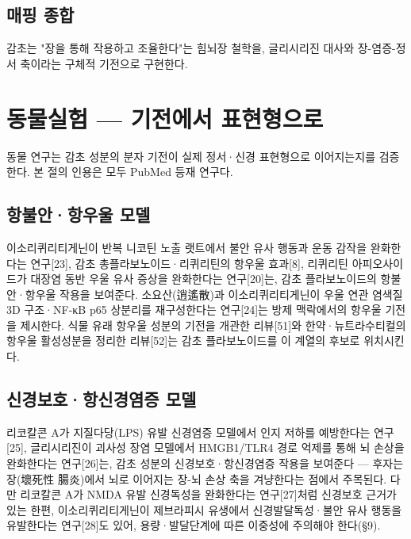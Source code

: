 \documentclass[11pt,oneside]{book}
\begin{document}
\subsection{매핑 종합}
\vspace{2pt}\vspace{3pt}

감초는 "장을 통해 작용하고 조율한다"는 힘뇌장 철학을, 글리시리진 대사와 장-염증-정서 축이라는 구체적 기전으로 구현한다.

\section{동물실험 — 기전에서 표현형으로}
동물 연구는 감초 성분의 분자 기전이 실제 정서·신경 표현형으로 이어지는지를 검증한다. 본 절의 인용은 모두 PubMed 등재 연구다.

\subsection{항불안·항우울 모델}
이소리퀴리티게닌이 반복 니코틴 노출 랫트에서 불안 유사 행동과 운동 감작을 완화한다는 연구[23], 감초 총플라보노이드·리퀴리틴의 항우울 효과[8], 리퀴리틴 아피오사이드가 대장염 동반 우울 유사 증상을 완화한다는 연구[20]는, 감초 플라보노이드의 항불안·항우울 작용을 보여준다. 소요산(逍遙散)과 이소리퀴리티게닌이 우울 연관 염색질 3D 구조·NF-κB p65 상분리를 재구성한다는 연구[24]는 방제 맥락에서의 항우울 기전을 제시한다. 식물 유래 항우울 성분의 기전을 개관한 리뷰[51]와 한약·뉴트라수티컬의 항우울 활성성분을 정리한 리뷰[52]는 감초 플라보노이드를 이 계열의 후보로 위치시킨다.

\subsection{신경보호·항신경염증 모델}
리코칼콘 A가 지질다당(LPS) 유발 신경염증 모델에서 인지 저하를 예방한다는 연구[25], 글리시리진이 괴사성 장염 모델에서 HMGB1/TLR4 경로 억제를 통해 뇌 손상을 완화한다는 연구[26]는, 감초 성분의 신경보호·항신경염증 작용을 보여준다 — 후자는 장(壞死性 腸炎)에서 뇌로 이어지는 장-뇌 손상 축을 겨냥한다는 점에서 주목된다. 다만 리코칼콘 A가 NMDA 유발 신경독성을 완화한다는 연구[27]처럼 신경보호 근거가 있는 한편, 이소리퀴리티게닌이 제브라피시 유생에서 신경발달독성·불안 유사 행동을 유발한다는 연구[28]도 있어, 용량·발달단계에 따른 이중성에 주의해야 한다(§9).
\end{document}
